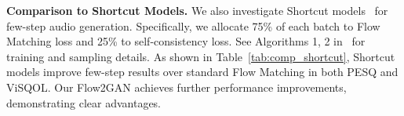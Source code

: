 \documentclass{article} %
\begin{document}
\begin{table}[h!]
\centering
\caption{Comparison to pure GAN training on LibriTTS dev set with Mel-spectrogram conditioning.}
\vspace{-0.5em}
\label{tab:ablation_gan}
\setlength{\tabcolsep}{3pt} %
\vspace{-0.5em}
\end{table}


\noindent\textbf{Comparison to Shortcut Models.} 
We also investigate Shortcut models~\citep{shortcut} for few-step audio generation. Specifically, we allocate 75\% of each batch to Flow Matching loss and 25\% to self-consistency loss. See Algorithms 1, 2 in~\citep{shortcut} for training and sampling details. As shown in Table~\ref{tab:comp_shortcut}, Shortcut models improve few-step results over standard Flow Matching in both PESQ and ViSQOL. Our Flow2GAN achieves further performance improvements, demonstrating clear advantages.
\end{document}
